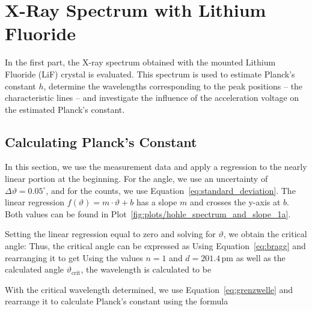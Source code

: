 \newpage

\section{X-Ray Spectrum with Lithium Fluoride}
\label{sec:A1}
In the first part, the X-ray spectrum obtained with the mounted Lithium Fluoride (LiF) crystal is evaluated. This spectrum is used to estimate Planck's constant $h$, determine the wavelengths corresponding to the peak positions -- the characteristic lines -- and investigate the influence of the acceleration voltage on the estimated Planck's constant.

\subsection{Calculating Planck's Constant}
In this section, we use the measurement data and apply a regression to the nearly linear portion at the beginning. 
For the angle, we use an uncertainty of $\Delta \vartheta = 0.05^\circ$, and for the counts, we use Equation~\ref{eq:standard_deviation}.
The linear regression $f(\vartheta)= m \cdot \vartheta + b$ has a slope $m$ and crosses the y-axis at $b$. Both values can be found in Plot~\ref{fig:plots/hohle_spectrum_and_slope_1a}.

Setting the linear regression equal to zero and solving for $\vartheta$, we obtain the critical angle:
Thus, the critical angle can be expressed as 
Using Equation~\ref{eq:bragg} and rearranging it to get
Using the values $n =1$ and $d=201.4$\,pm as well as the calculated angle $\vartheta_\text{crit}$, the wavelength is calculated to be

With the critical wavelength determined, we use Equation~\ref{eq:grenzwelle} and rearrange it to calculate Planck's constant using the formula

